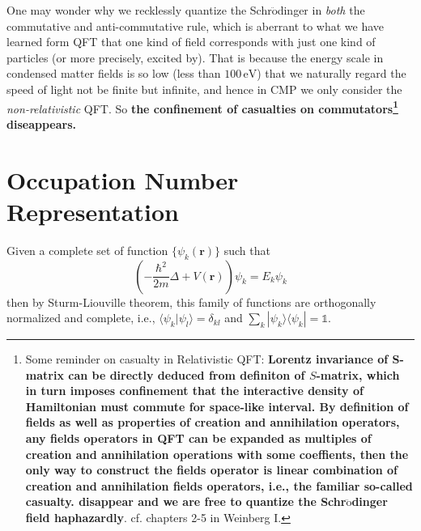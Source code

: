 \documentclass[b5paper,10pt,UTF8]{book}
\newcommand*\dd{\mathop{}\!\mathrm{d}}
\numberwithin{equation}{section}
\begin{document}
		\begin{Note}
			One may wonder why we recklessly quantize the Schr$\ddot{\text{o}}$dinger in \emph{both} the commutative and anti-commutative rule, which is aberrant to what we have learned form QFT that one kind of field corresponds with just one kind of particles (or more precisely, excited by). That is because the energy scale in condensed matter fields is so low (less than $100\,\mathrm{eV}$) that we naturally regard the speed of light not be finite but infinite, and hence in CMP we only consider the \emph{non-relativistic} QFT. So \textbf{the confinement of casualties on commutators\footnote{Some reminder on casualty in Relativistic QFT: \textbf{Lorentz invariance of S-matrix can be directly deduced from definiton of $S$-matrix, which in turn imposes confinement that the interactive density of Hamiltonian must commute for space-like interval. By definition of fields as well as properties of creation and annihilation operators, any fields operators in QFT can be expanded as multiples of creation and annihilation operations with some coeffients, then the only way to construct the fields operator is linear combination of creation and annihilation fields operators, i.e., the familiar so-called casualty. disappear and we are free to quantize the Schr$\ddot{\text{o}}$dinger field haphazardly}. cf. chapters 2-5 in Weinberg I.} diseappears.}
		\end{Note}
	\section{Occupation Number Representation}
		Given a complete set of function $\{\psi_k(\bm{r})\}$ such that
		$$\left(-\dfrac{\hbar^2}{2m}\Delta+V(\bm{r})\right)\psi_k=E_k\psi_k$$
		then by Sturm-Liouville theorem, this family of functions are orthogonally normalized and complete, i.e., $\langle\psi_k|\psi_l\rangle=\delta_{kl}$ and $\displaystyle\sum_{k}|\psi_k\rangle\langle\psi_k|=\mathbb{1}$.
\end{document}
